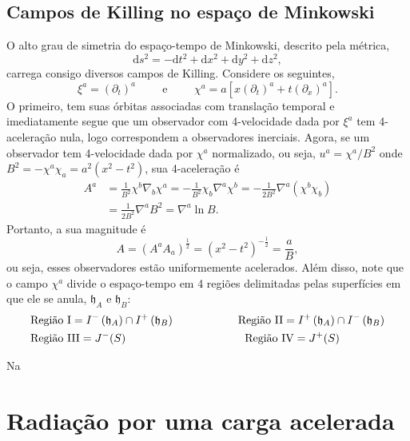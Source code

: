 \documentclass[12pt]{article}
\newcommand{\dd}{\mathrm{d}}
\begin{document}
\subsection*{Campos de Killing no espaço de Minkowski}
O alto grau de simetria do espaço-tempo de Minkowski, descrito pela métrica,
\begin{equation}
    \dd s^2=-\dd t^2+\dd x^2+\dd y^2+\dd z^2,
\end{equation}
carrega consigo diversos campos de Killing. Considere os seguintes,
\begin{equation}
    \xi^a=\left(\partial_t\right)^a\hspace{1cm}\text{e}\hspace{1cm}\chi^a=a\left[x\left(\partial_t\right)^a+t\left(\partial_x\right)^a\right].
\end{equation}
O primeiro, tem suas órbitas associadas com translação temporal e imediatamente segue que um observador com 4-velocidade dada por \(\xi^a\) tem 4-aceleração nula, logo correspondem a observadores inerciais. Agora, se um observador tem 4-velocidade dada por \(\chi^a\) normalizado, ou seja, \(u^a=\chi^a/B^2\) onde \(B^2=-\chi^a\chi_a=a^2(x^2-t^2)\), sua 4-aceleração é
\begin{subequations}
    \begin{align}
        A^a&=\frac{1}{B^2}\chi^b\nabla_b\chi^a=-\frac{1}{B^2}\chi_b\nabla^a\chi^b=-\frac{1}{2B^2}\nabla^a\left(\chi^b\chi_b\right)\\
        &=\frac{1}{2B^2}\nabla^aB^2=\nabla^a\ln{B}.
    \end{align}
\end{subequations}
Portanto, a sua magnitude é
\begin{equation}
    A=\left(A^aA_a\right)^{\frac{1}{2}}=(x^2-t^2)^{-\frac{1}{2}}=\frac{a}{B},
\end{equation}
ou seja, esses observadores estão uniformemente acelerados. Além disso, note que o campo \(\chi^a\) divide o espaço-tempo em 4 regiões delimitadas pelas superfícies em que ele se anula, \(\mathfrak{h}_A\) e \(\mathfrak{h}_B\):
\begin{equation}
    \begin{aligned}
        &\text{Região I}=I^-\left(\mathfrak{h}_A\right)\cap I^+\left(\mathfrak{h}_B\right)\hspace{2cm}\text{Região II}=I^+\left(\mathfrak{h}_A\right)\cap I^-\left(\mathfrak{h}_B\right)\\
        &\text{Região III}=J^-(S)\hspace{3.75cm}\text{Região IV}=J^+(S)
    \end{aligned}
\end{equation}

Na
\section{Radiação por uma carga acelerada}
\end{document}
